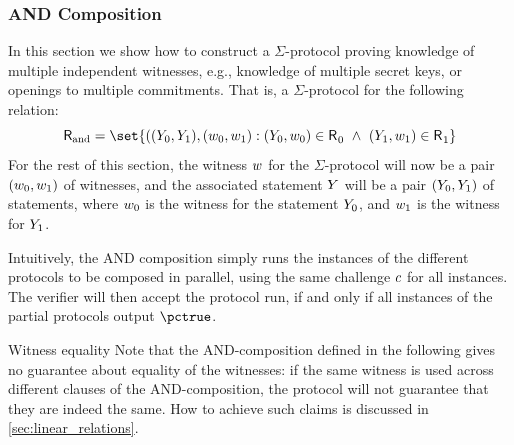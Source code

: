 \documentclass[11pt]{article}
\begin{document}
  \subsubsection{AND Composition}
  In this section we show how to construct a $\Sigma$-protocol proving knowledge of multiple independent witnesses, e.g., knowledge of multiple secret keys, or openings to multiple commitments.
  That is, a $\Sigma$-protocol for the following relation:
\[
  \relation[and] = \set{
    ((\statement_0,\statement_1),(\witness_0,\witness_1) : (\statement_0,\witness_0)\in \relation_0 ~\land~ (\statement_1,\witness_1)\in\relation_1}
\]
For the rest of this section, the witness $w$ for the $\Sigma$-protocol will now be a pair $(w_0, w_1)$ of witnesses, and the associated statement $Y$ will be a pair $(Y_0, Y_1)$ of statements, where $w_0$ is the witness for the statement $Y_0$, and $w_1$ is the witness for $Y_1$.

  Intuitively, the AND composition simply runs the instances of the different protocols to be composed in parallel, using the same challenge $c$ for all instances.
  The verifier will then accept the protocol run, if and only if all instances of the partial protocols output $\accept$.
  \begin{warning}{Witness equality}{}
  Note that the AND-composition defined in the following gives no guarantee about equality of the witnesses: if the same witness is used across different clauses of the AND-composition, the protocol will not guarantee that they are indeed the same.
	How to achieve such claims is discussed in \cref{sec:linear_relations}.
  \end{warning}
\end{document}
